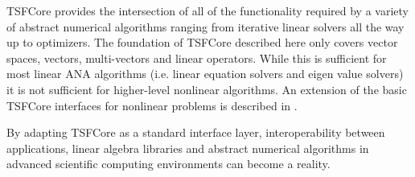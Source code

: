 TSFCore provides the intersection of all of the functionality required
by a variety of abstract numerical algorithms ranging from iterative
linear solvers all the way up to optimizers.  The foundation of
TSFCore described here only covers vector spaces, vectors,
multi-vectors and linear operators.  While this is sufficient for most
linear ANA algorithms (i.e. linear equation solvers and eigen value
solvers) it is not sufficient for higher-level nonlinear algorithms.
An extension of the basic TSFCore interfaces for nonlinear problems is
described in {}\cite{ref:TSFCore::Nonlin}.

By adapting TSFCore as a standard interface layer, interoperability
between applications, linear algebra libraries and abstract numerical
algorithms in advanced scientific computing environments can become a
reality.
